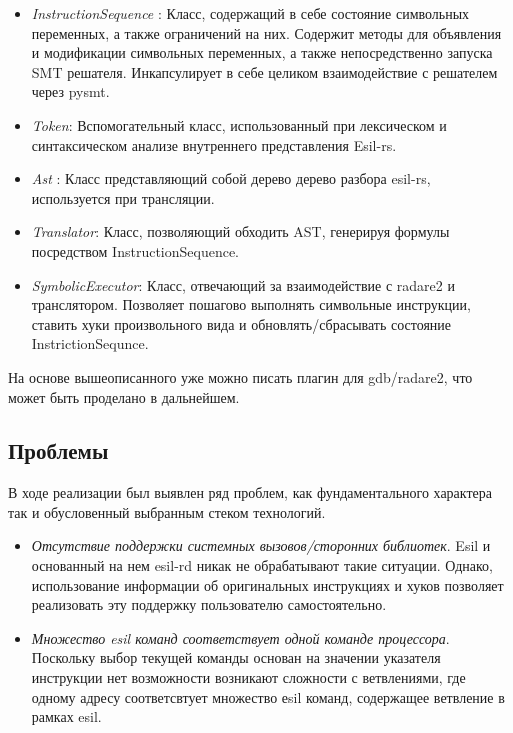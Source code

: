 \begin{itemize}
\item {\em InstructionSequence }: Класс, содержащий в себе состояние символьных переменных, а также ограничений на них. Содержит методы для объявления и модификации символьных переменных, а также непосредственно запуска SMT решателя. Инкапсулирует в себе целиком взаимодействие с решателем через pysmt.

\item {\em Token}: Вспомогательный класс, использованный при лексическом и синтаксическом анализе внутреннего представления Esil-rs.

\item {\em Ast }: Класс представляющий собой дерево дерево разбора esil-rs, используется при трансляции.

\item {\em Translator}: Класс, позволяющий обходить AST, генерируя формулы посредством InstructionSequence.

\item {\em SymbolicExecutor}: Класс, отвечающий за взаимодействие с radare2 и транслятором. Позволяет пошагово выполнять символьные инструкции, ставить хуки произвольного вида и обновлять/сбрасывать состояние InstrictionSequnce.

\end{itemize}

На основе вышеописанного уже можно писать плагин для gdb/radare2, что может быть проделано в дальнейшем.

\subsection{Проблемы}

В ходе реализации был выявлен ряд проблем, как фундаментального характера так и обусловенный выбранным стеком технологий. 

\begin{itemize}
\item {\em Отсутствие поддержки системных вызовов/сторонних библиотек}. Esil и основанный на нем esil-rd никак не обрабатывают такие ситуации. Однако, использование информации об оригинальных инструкциях и хуков позволяет реализовать эту поддержку пользователю самостоятельно.

\item {\em Множество esil команд соответствует одной команде процессора}. Поскольку выбор текущей команды основан на значении указателя инструкции нет возможности возникают сложности с ветвлениями, где одному адресу соответсвтует множество еsil команд, содержащее ветвление в рамках esil.

\end{itemize}


